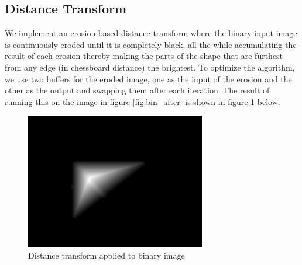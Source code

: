 \documentclass[]{article}
\begin{document}
\subsection{Distance Transform}
We implement an erosion-based distance transform where the binary input image is continuously eroded until it is completely black, all the while accumulating the result of each erosion thereby making the parts of the shape that are furthest from any edge (in chessboard distance) the brightest. To optimize the algorithm, we use two buffers for the eroded image, one as the input of the erosion and the other as the output and swapping them after each iteration. The result of running this on the image in figure \ref{fig:bin_after} is shown in figure \ref{fig:dist_transform} below.
\begin{figure}[H]
\centering
\includegraphics[width=0.7\textwidth]{img/noisy-distance}
\caption{Distance transform applied to binary image}
\label{fig:dist_transform}
\end{figure}
\end{document}
